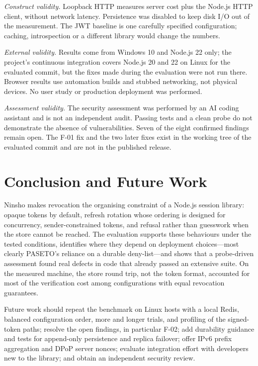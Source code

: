 \documentclass[conference]{IEEEtran}
\begin{document}
\emph{Construct validity.} Loopback HTTP measures server cost plus the Node.js HTTP client, without network latency. Persistence was disabled to keep disk I/O out of the measurement. The JWT baseline is one carefully specified configuration; caching, introspection or a different library would change the numbers.

\emph{External validity.} Results come from Windows 10 and Node.js 22 only; the project's continuous integration covers Node.js 20 and 22 on Linux for the evaluated commit, but the fixes made during the evaluation were not run there. Browser results use automation builds and stubbed networking, not physical devices. No user study or production deployment was performed.

\emph{Assessment validity.} The security assessment was performed by an AI coding assistant and is not an independent audit. Passing tests and a clean probe do not demonstrate the absence of vulnerabilities. Seven of the eight confirmed findings remain open. The F-01 fix and the two later fixes exist in the working tree of the evaluated commit and are not in the published release.

\section{Conclusion and Future Work}
\label{sec:conclusion}

Ninsho makes revocation the organising constraint of a Node.js session library: opaque tokens by default, refresh rotation whose ordering is designed for concurrency, sender-constrained tokens, and refusal rather than guesswork when the store cannot be reached. The evaluation supports these behaviours under the tested conditions, identifies where they depend on deployment choices---most clearly PASETO's reliance on a durable deny-list---and shows that a probe-driven assessment found real defects in code that already passed an extensive suite. On the measured machine, the store round trip, not the token format, accounted for most of the verification cost among configurations with equal revocation guarantees.

Future work should repeat the benchmark on Linux hosts with a local Redis, balanced configuration order, more and longer trials, and profiling of the signed-token paths; resolve the open findings, in particular F-02; add durability guidance and tests for append-only persistence and replica failover; offer IPv6 prefix aggregation and DPoP server nonces; evaluate integration effort with developers new to the library; and obtain an independent security review.
\end{document}
